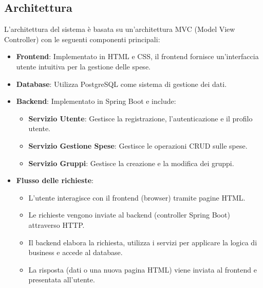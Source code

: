 \subsection{Architettura}
L'architettura del sistema è basata su un'architettura MVC (Model View Controller) con le seguenti componenti principali:
\begin{itemize}
    \item \textbf{Frontend}: Implementato in HTML e CSS, il frontend fornisce un'interfaccia utente intuitiva per la gestione delle spese.
    \item \textbf{Database}: Utilizza PostgreSQL come sistema di gestione dei dati.
    \item \textbf{Backend}: Implementato in Spring Boot e include:
    \begin{itemize}
        \item \textbf{Servizio Utente}: Gestisce la registrazione, l'autenticazione e il profilo utente.
        \item \textbf{Servizio Gestione Spese}: Gestisce le operazioni CRUD sulle spese.
        \item \textbf{Servizio Gruppi}: Gestisce la creazione e la modifica dei gruppi.
    \end{itemize}
    
    \item \textbf{Flusso delle richieste}: 
    \begin{itemize}
        \item \textbf{} L'utente interagisce con il frontend (browser) tramite pagine HTML.
        \item \textbf{} Le richieste vengono inviate al backend (controller Spring Boot) attraverso HTTP.
        \item \textbf{} Il backend elabora la richiesta, utilizza i servizi per applicare la logica di business e accede al database.
        \item \textbf{}La risposta (dati o una nuova pagina HTML) viene inviata al frontend e presentata all'utente.
    \end{itemize}
\end{itemize}
